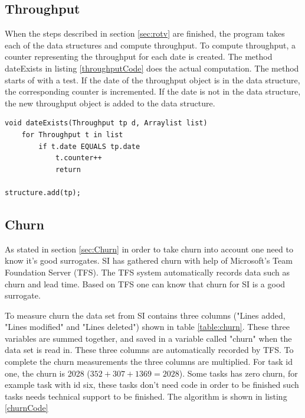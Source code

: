 \documentclass[UKenglish]{ifimaster}  %
\begin{document}
\subsection{Throughput}
 \label{sec:TP}
When the steps described in section \ref{sec:rotv} are finished, the program takes each of the data structures and compute throughput. To compute throughput, a counter representing the throughput for each date is created. The method dateExists in listing \ref{throughputCode} does the actual computation. The method starts of with a test. If the date of the throughput object is in the data structure, the corresponding counter is incremented.  If the date is not in the data structure, the new throughput object is added to the data structure. 
\begin{minipage}{\textwidth}
\begin{lstlisting}[caption=Pseudocode example of how throughput is measured, label=throughputCode]
void dateExists(Throughput tp d, Arraylist list)
	for Throughput t in list
		if t.date EQUALS tp.date
			t.counter++
			return
			
structure.add(tp);
\end{lstlisting}
 \end{minipage}


\subsection{Churn}
\label{sec:churn}
As stated in section \ref{sec:Churn} in order to take churn into account one need to know it's good surrogates. SI has gathered churn with help of Microsoft's Team Foundation Server (TFS). The TFS system automatically records data such as churn and lead time. Based on TFS one can know that churn for SI is a good surrogate.

To measure churn the data set from SI contains three columns ("Lines added, "Lines modified" and "Lines deleted") shown in table \ref{table:churn}. These three variables are summed together, and saved in a  variable called "churn" when the data set is read in. These three columns are automatically recorded by TFS.  To complete the churn measurements the three columns are multiplied.  For task id one, the churn is 2028 ($352+307+1369 = 2028$). Some tasks has zero churn, for example task with id six, these tasks don't need code in order to be finished such tasks needs technical support to be finished. The algorithm is shown in listing \ref{churnCode}
\end{document}
